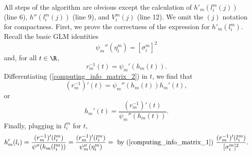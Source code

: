 \documentclass[11pt]{article}
\begin{document}
\begin{appendices}
\begin{refsection}
All steps of the algorithm are obvious except the calculation of $h'_m(l^m_i(j))$ (line 6), $h''(l^m_i(j))$ (line 9), and $V^m_i(j)$ (line 12). We omit the $(j)$ notation for compactness. First, we prove the correctness of the expression for $h'_m(l^m_i)$. Recall the basic GLM identities
\begin{equation}\label{computing_info_matrix_1}
\psi_m''(\eta_i^m) =  [\sigma^m_i]^2
\end{equation}
 and, for all $t \in \R$, 
\begin{equation}\label{computing_info_matrix_2}
 r_m^{-1}(t) = \psi_m'(h_m(t)).
\end{equation}
 Differentiating (\ref{computing_info_matrix_2}) in $t$, we find that
\begin{equation}\label{computing_info_matrix_3}
 (r_m^{-1})'(t) = \psi_m''(h_m(t))h_m'(t), 
\end{equation}
or  $$h_m'(t) = \frac{(r_m^{-1})'(t) }{\psi_m''(h_m(t))}.$$ Finally, plugging in $l^m_i$ for $t$,
$$ h_m'(l_i) = \frac{(r_m^{-1})'(l^m_i)}{\psi''(h_m(l^m_i))} = \frac{(r_m^{-1})'(l^m_i)}{\psi_m''(\eta^m_i)} = \textrm{ by (\ref{computing_info_matrix_1}) } \frac{(r_m^{-1})'(l_i^m)}{[\sigma_i^m]^2}.$$


\end{refsection}
\end{appendices}
\end{document}
